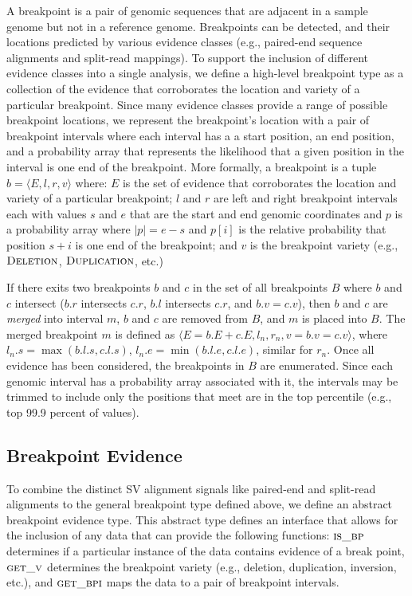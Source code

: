 \documentclass[10pt]{bmc_article}
\newenvironment{bmcformat}{\begin{raggedright}\baselineskip20pt\sloppy\setboolean{publ}{false}}{\end{raggedright}\baselineskip20pt\sloppy}
\begin{document}
\begin{bmcformat}
A breakpoint is a pair of genomic sequences that are adjacent in a sample genome
but not in a reference genome. Breakpoints can be detected, and their locations
predicted by various evidence classes (e.g., paired-end sequence alignments and
split-read mappings).  To support the inclusion of different evidence classes
into a single analysis, we define a high-level breakpoint type as a collection
of the evidence that corroborates the location and variety of a particular
breakpoint.  Since many evidence classes provide a range of possible breakpoint
locations, we represent the breakpoint's location with a pair of breakpoint
intervals where each interval has a a start position, an end position, and a
probability array that represents the likelihood that a given position in the
interval is one end of the breakpoint.  More formally, a breakpoint is a tuple
$b=\langle E,l,r,v \rangle$ where: $E$ is the set of evidence that corroborates
the location and variety of a particular breakpoint; $l$ and $r$ are left and
right breakpoint intervals each with values $s$ and $e$ that are the start and
end genomic coordinates and $p$ is a probability array where $|p|=e-s$ and
$p[i]$ is the relative probability that position $s+i$ is one end of the
breakpoint; and $v$ is the breakpoint variety (e.g., $\textsc{Deletion}$,
$\textsc{Duplication}$, etc.)

If there exits two breakpoints $b$ and $c$ in the set of all breakpoints $B$
where $b$ and $c$  intersect ($b.r$ intersects $c.r$, $b.l$ intersects $c.r$,
and $b.v = c.v$), then $b$ and $c$ are {\em merged} into interval $m$, $b$ and
$c$ are removed from $B$, and $m$ is placed into $B$.  The merged breakpoint $m$
is defined as $\langle E = b.E + c.E, l_n, r_n, v = b.v = c.v\rangle$, where
$l_n.s = \max(b.l.s, c.l.s)$, $l_n.e = \min(b.l.e, c.l.e)$, similar for $r_n$.
Once all evidence has been considered, the breakpoints in $B$ are enumerated.
Since each genomic interval has a probability array associated with it, the
intervals may be trimmed to include only the positions that meet are in the top
percentile (e.g., top 99.9 percent of values).

\subsection*{Breakpoint Evidence}

To combine the distinct SV alignment signals like paired-end and split-read
alignments to the general breakpoint type defined above, we define an
abstract breakpoint evidence type.  This abstract type defines an interface that
allows for the inclusion of any data that can provide the following functions:
$\textsc{is\_bp}$ determines if a particular instance of the data contains
evidence of a break point, $\textsc{get\_v}$ determines the breakpoint variety
(e.g., deletion, duplication, inversion, etc.), and $\textsc{get\_bpi}$
maps the data to a pair of breakpoint intervals.


\end{bmcformat}
\end{document}
